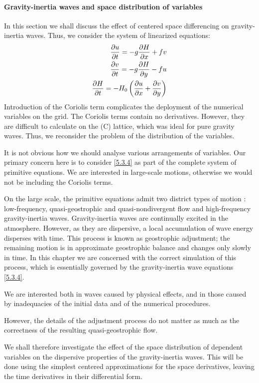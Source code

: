 \paragraph{Gravity-inertia waves and space distribution of variables}
In this section we shall discuss the effect of centered space differencing on gravity-inertia waves. Thus, we consider the system of linearized equations: 
\begin{align}\label{5.3.4}
    \frac{\partial u}{\partial t}=-g\frac{\partial H}{\partial x}+fv \\
    \frac{\partial v}{\partial t}=-g\frac{\partial H}{\partial y}-fu \notag \\
    \frac{\partial H}{\partial t}=-H_0\left(\frac{\partial u}{\partial x}+\frac{\partial v}{\partial y}\right)\notag
\end{align}
Introduction of the Coriolis term complicates the deployment of the numerical variables on the grid. The Coriolis terms contain no derivatives. However, they are difficult to calculate on the (C) lattice, which was ideal for pure gravity waves.
Thus, we reconsider the problem of the distribution of the variables.

It is not obvious how we should analyse various arrangements of variables. Our primary concern here is to consider \ref{5.3.4} as part of the complete system of primitive equations. We are interested in large-scale motions, otherwise we would not be including the Coriolis terms.

On the large scale, the primitive equations admit two district types of motion : low-frequency, quasi-geostrophic and quasi-nondivergent flow and high-frequency gravity-inertia waves. Gravity-inertia waves are continually excited in the atmosphere. However, as they are dispersive, a local accumulation of wave energy disperses with time. This process is known as geostrophic adjustment; the remaining motion is in approximate geostrophic balance and changes only slowly in time. In this chapter we are concerned with the correct simulation of this process, which is essentially governed by the gravity-inertia wave equations \ref{5.3.4}.

We are interested both in waves caused by physical effects, and in those caused by inadequacies of the initial data and of the numerical procedures.

However, the details of the adjustment process do not matter as much as the correctness of the resulting quasi-geostrophic flow.

We shall therefore investigate the effect of the space distribution of dependent variables on the dispersive properties of the gravity-inertia waves. This will be done using the simplest centered approximations for the space derivatives, leaving the time derivatives in their differential form.

